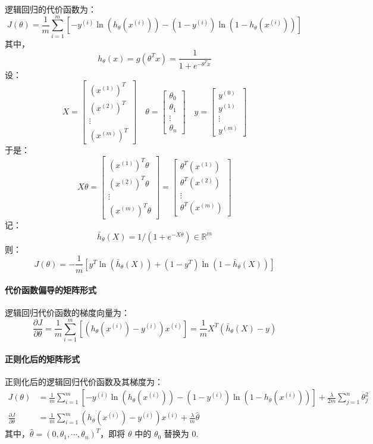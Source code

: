 逻辑回归的代价函数为：
\[
J(\theta)=\frac{1}{m}\sum_{i=1}^m\left[-y^{(i)}\ln(h_\theta(x^{(i)}))-(1-y^{(i)})\ln(1-h_\theta(x^{(i)}))\right]
\]
其中，
\[
h_\theta(x)=g(\theta^Tx)=\frac{1}{1+e^{-\theta^Tx}}
\]
设：
\[
X=\begin{bmatrix}(x^{(1)})^T\\(x^{(2)})^T\\\vdots\\(x^{(m)})^T\end{bmatrix}\quad \theta=\begin{bmatrix}\theta_0\\\theta_1\\\vdots\\\theta_n\end{bmatrix}\quad y=\begin{bmatrix}y^{(0)}\\y^{(1)}\\\vdots\\y^{(m)}\end{bmatrix}
\]
于是：
\[
X\theta=\begin{bmatrix}(x^{(1)})^T\theta\\(x^{(2)})^T\theta\\\vdots\\(x^{(m)})^T\theta\end{bmatrix}=\begin{bmatrix}\theta^T(x^{(1)})\\\theta^T(x^{(2)})\\\vdots\\\theta^T(x^{(m)})\end{bmatrix}
\]
记：
\[
{\bar h}_\theta(X)=1/(1+e^{-X\theta})\in\mathbb R^{m}
\]
则：
\[
J(\theta)=-\frac{1}{m}\left[y^T\ln({\bar h}_\theta(X))+(1-y^T)\ln(1-{\bar h}_\theta(X))\right]
\]


\paragraph{代价函数偏导的矩阵形式}

逻辑回归代价函数的梯度向量为：
\[
\frac{\partial J}{\partial \theta}=\frac{1}{m}\sum_{i=1}^m\left[\left(h_\theta(x^{(i)})-y^{(i)}\right)x^{(i)}\right]=\frac{1}{m}X^T({\bar h}_\theta(X)-y)
\]


\paragraph{正则化后的矩阵形式}

正则化后的逻辑回归代价函数及其梯度为：
\begin{align*}
J(\theta)&=\frac{1}{m}\sum_{i=1}^m\left[-y^{(i)}\ln(h_\theta(x^{(i)}))-(1-y^{(i)})\ln(1-h_\theta(x^{(i)}))\right]+\frac{\lambda}{2m}\sum_{j=1}^n\theta_j^2\\
\frac{\partial J}{\partial \theta}&=\frac{1}{m}\sum_{i=1}^m\left(h_\theta(x^{(i)})-y^{(i)}\right)x^{(i)}+\frac{\lambda}{m}\hat\theta
\end{align*}
其中，$\hat\theta=(0,\theta_1,\cdots,\theta_n)^T$，即将 $\theta$ 中的 $\theta_0$ 替换为 $0$. 

